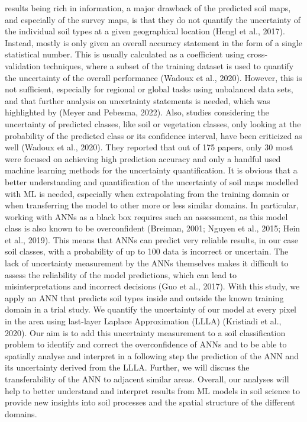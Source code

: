 results being rich in information, a major drawback of the predicted soil
maps, and especially of the survey maps, is that they do not quantify the
uncertainty of the individual soil types at a given geographical location
(Hengl et al., 2017). Instead, mostly is only given an overall accuracy
statement in the form of a single statistical number. This is usually
calculated as a coefficient using cross-validation techniques, where a
subset of the training dataset is used to quantify the uncertainty of the
overall performance (Wadoux et al., 2020). However, this is not sufficient,
especially for regional or global tasks using unbalanced data sets,
and that further analysis on uncertainty statements is needed, which was
highlighted by (Meyer and Pebesma, 2022). Also, studies considering
the uncertainty of predicted classes, like soil or vegetation classes, only
looking at the probability of the predicted class or its confidence interval,
have been criticized as well (Wadoux et al., 2020). They reported
that out of 175 papers, only 30 %
most were focused on achieving high prediction accuracy and only a
handful used machine learning methods for the uncertainty quantification.
It is obvious that a better understanding and quantification of the
uncertainty of soil maps modelled with ML is needed, especially when
extrapolating from the training domain or when transferring the model
to other more or less similar domains. In particular, working with ANNs
as a black box requires such an assessment, as this model class is also
known to be overconfident (Breiman, 2001; Nguyen et al., 2015; Hein
et al., 2019). This means that ANNs can predict very reliable results, in
our case soil classes, with a probability of up to 100 %
data is incorrect or uncertain. The lack of uncertainty measurement by
the ANNs themselves makes it difficult to assess the reliability of the
model predictions, which can lead to misinterpretations and incorrect
decisions (Guo et al., 2017). With this study, we apply an ANN that
predicts soil types inside and outside the known training domain in a
trial study. We quantify the uncertainty of our model at every pixel in
the area using last-layer Laplace Approximation (LLLA) (Kristiadi et al.,
2020). Our aim is to add this uncertainty measurement to a soil classification
problem to identify and correct the overconfidence of ANNs and
to be able to spatially analyse and interpret in a following step the
prediction of the ANN and its uncertainty derived from the LLLA.
Further, we will discuss the transferability of the ANN to adjacent
similar areas. Overall, our analyses will help to better understand and
interpret results from ML models in soil science to provide new insights
into soil processes and the spatial structure of the different domains.


